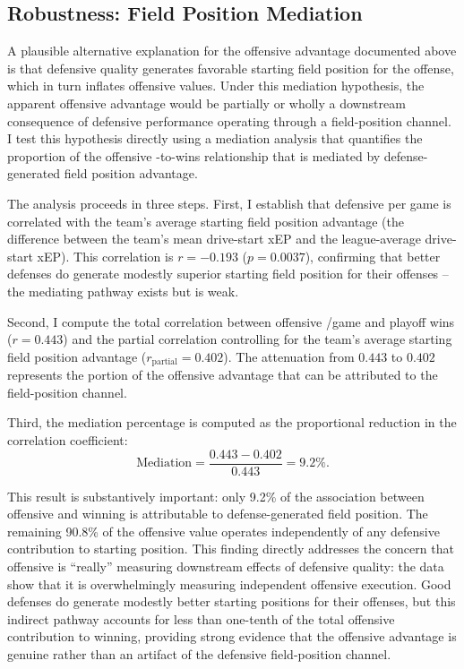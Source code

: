 \subsection{Robustness: Field Position Mediation}
\label{sec:mediation-findings}

A plausible alternative explanation for the offensive advantage documented
above is that defensive quality generates favorable starting field position for
the offense, which in turn inflates offensive \xvoa{} values. Under this
mediation hypothesis, the apparent offensive advantage would be partially or
wholly a downstream consequence of defensive performance operating through a
field-position channel. I test this hypothesis directly using a mediation
analysis \parencite{baron1986moderator} that quantifies the proportion of the
offensive \xvoa{}-to-wins relationship that is mediated by defense-generated
field position advantage.

The analysis proceeds in three steps. First, I establish that defensive \xvoa{}
per game is correlated with the team's average starting field position advantage
(the difference between the team's mean drive-start xEP and the league-average
drive-start xEP). This correlation is $r = -0.193$ ($p = 0.0037$), confirming
that better defenses do generate modestly superior starting field position for
their offenses -- the mediating pathway exists but is weak.

Second, I compute the total correlation between offensive \xvoa{}/game and
playoff wins ($r = 0.443$) and the partial correlation controlling for the
team's average starting field position advantage ($r_{\mathrm{partial}} =
0.402$). The attenuation from $0.443$ to $0.402$ represents the portion of
the offensive advantage that can be attributed to the field-position channel.

Third, the mediation percentage is computed as the proportional reduction in
the correlation coefficient:
\[
  \text{Mediation} = \frac{0.443 - 0.402}{0.443} = 9.2\%.
\]

This result is substantively important: only 9.2\% of the association between
offensive \xvoa{} and winning is attributable to defense-generated field
position. The remaining 90.8\% of the offensive value operates independently
of any defensive contribution to starting position. This finding directly
addresses the concern that offensive \xvoa{} is ``really'' measuring downstream
effects of defensive quality: the data show that it is overwhelmingly
measuring independent offensive execution. Good defenses do generate modestly
better starting positions for their offenses, but this indirect pathway
accounts for less than one-tenth of the total offensive contribution to
winning, providing strong evidence that the offensive advantage is genuine
rather than an artifact of the defensive field-position channel.


